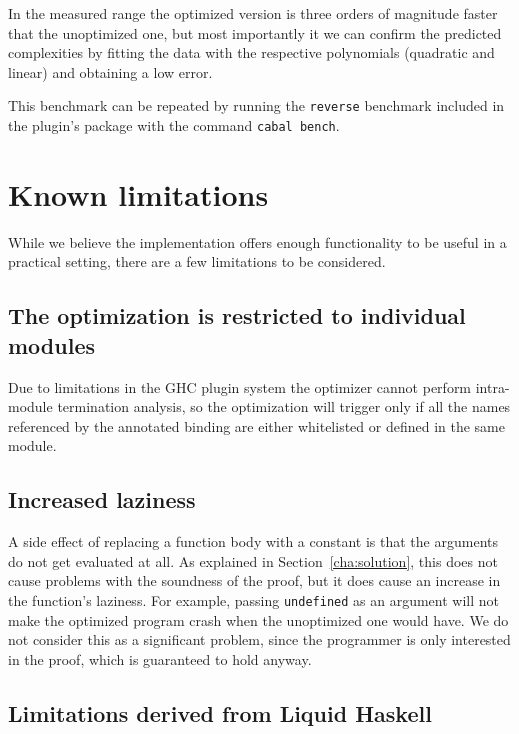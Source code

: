 In the measured range the optimized version is three orders of magnitude faster that the unoptimized one, but most importantly it we can confirm the predicted complexities by fitting the data with the respective polynomials (quadratic and linear) and obtaining a low error.

This benchmark can be repeated by running the \texttt{reverse} benchmark included in the plugin's package with the command \texttt{cabal bench}.

\section{Known limitations}
\label{sec:limitations}

While we believe the implementation offers enough functionality to be useful in a practical setting, there are a few limitations to be considered.

\subsection{The optimization is restricted to individual modules}
\label{subsec:single-module}

Due to limitations in the GHC plugin system the optimizer cannot perform intra-module termination analysis, so the optimization will trigger only if all the names referenced by the annotated binding are either whitelisted or defined in the same module.

\subsection{Increased laziness}
\label{subsec:limitations-laziness}

A side effect of replacing a function body with a constant is that the arguments do not get evaluated at all.
As explained in Section~\ref{cha:solution}, this does not cause problems with the soundness of the proof, but it does cause an increase in the function's laziness.
For example, passing \texttt{undefined} as an argument will not make the optimized program crash when the unoptimized one would have.
We do not consider this as a significant problem, since the programmer is only interested in the proof, which is guaranteed to hold anyway.

\subsection{Limitations derived from Liquid Haskell}
\label{subsec:limitations-lh}

